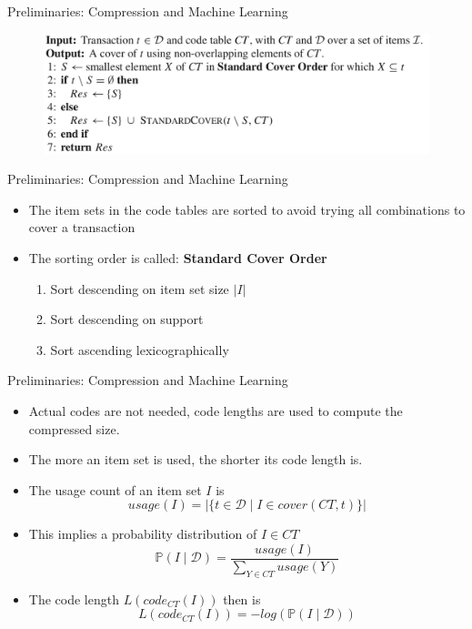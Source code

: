 \documentclass{beamer}
\newcommand{\codetable}{CT}
\newcommand{\dataset}{\mathcal{D}}
\newcommand{\prob}{\mathbb{P}}
\begin{document}
\begin{frame}{Preliminaries: Compression and Machine Learning}
\begin{figure}[H]
  \centering
   \includegraphics[width=\textwidth]{img/cover}
\end{figure}
\end{frame}

\begin{frame}{Preliminaries: Compression and Machine Learning}
\begin{itemize}
	\item The item sets in the code tables are sorted to avoid trying all combinations to cover a transaction
	\item The sorting order is called: \textbf{Standard Cover Order}
			\begin{enumerate}
				\item Sort descending on item set size $|I|$
				\item Sort descending on support
				\item Sort ascending lexicographically
			\end{enumerate}
\end{itemize}
\end{frame}

\begin{frame}{Preliminaries: Compression and Machine Learning}
\begin{itemize}
	\item Actual codes are not needed, code lengths are used to compute the compressed size.
	\item The more an item set is used, the shorter its code length is.
	\item The usage count of an item set $I$ is \[usage(I) = |\{t \in \dataset \mid I \in cover(\codetable, t)\}|\]
	\item This implies a probability distribution of $I \in \codetable$ \[\prob(I \mid \dataset) = \frac{usage(I)}{\sum_{Y\in\codetable}usage(Y)}\]
	\item The code length $L(code_{\codetable}(I))$ then is \[L(code_{\codetable}(I)) = -log(\prob(I\mid\dataset))\]
\end{itemize}
\end{frame}
\end{document}
